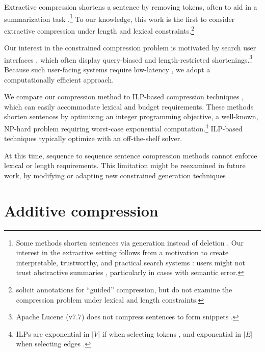 \documentclass[11pt,a4paper]{article}
\begin{document}
Extractive compression \cite{Knight2000StatisticsBasedS,clarke2008global,filippova2015sentence,Wang2017CanSH} shortens a sentence by removing tokens, often to aid in a summarization task \cite{Knight2000StatisticsBasedS,almeida2013fast,P16-1188}.\footnote{Some methods shorten sentences via generation instead of deletion \cite{rush2015neural,mallinson18}. Our interest in the extractive setting follows from a motivation to create interpretable,  trustworthy, and practical search systems \cite{Chuang2012InterpretationAT}: users might not trust abstractive summaries \cite{Zhang:2018:MSG:3290265.3274465}, particularly in cases with semantic error.} To our knowledge, this work is the first to consider extractive compression under length and lexical constraints.\footnote{\citet{Li2013DocumentSV} solicit annotations for ``guided'' compression, but do not examine the compression problem under lexical and length constraints.}

Our interest in the constrained compression problem is motivated by search user interfaces \cite{hearst2009search}, which often display query-biased \cite{tombros1998advantages} and length-restricted shortenings.\footnote{Apache Lucene {\small (v7.7)} does not compress sentences to form snippets \cite{lucene}.} 
Because such user-facing systems require low-latency \cite{Nielsen,heerschei,Liu2014TheEO}, we adopt a computationally efficient approach. 

We compare our compression method to ILP-based compression techniques \cite{clarke2008global,filippova2008dependency,filippova2013overcoming,Wang2017CanSH}, which can easily accommodate lexical and budget requirements. These methods shorten sentences by optimizing an integer programming objective, a well-known, NP-hard problem \cite{clarke2008global} requiring worst-case exponential computation.\footnote{ILPs are exponential in $|V|$ if when selecting tokens \cite{clarke2008global}, and exponential in $|E|$ when selecting edges \cite{filippova2013overcoming}.} ILP-based techniques typically optimize with an off-the-shelf solver. 

At this time, sequence to sequence sentence compression methods \cite{filippova2015sentence}  cannot enforce lexical or length requirements. This limitation might be reexamined in future work, by modifying or adapting new constrained generation techniques \cite{N18-1119,D18-1443,aaimh}.

\section{Additive compression}\label{s:system}
\end{document}
